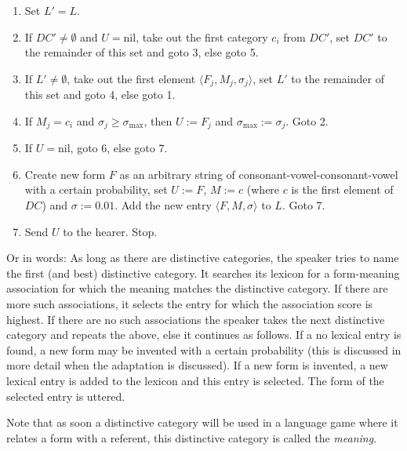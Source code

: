 \begin{enumerate}

\item Set $L'=L$.

\item If $DC' \neq \emptyset$ and $U=\mbox{nil}$, take out the first category $c_i$ from $DC'$, set $DC'$ to the remainder of this set and goto 3, else goto 5.

\item If $L' \neq \emptyset$, take out the first element $\langle F_j,M_j,\sigma_j \rangle$, set $L'$ to the remainder of this set and goto 4, else goto 1.

\item If $M_j = c_i$ and $\sigma_j \geq \sigma_{\mbox{max}}$, then $U:=F_j$ and $\sigma_{\mbox{max}}:=\sigma_j$. Goto 2.

\item If $U = \mbox{nil}$, goto 6, else goto 7.

\item Create new form $F$ as an arbitrary string of consonant-vowel-consonant-vowel with a certain probability, set $U:=F$, $M:=c$ (where $c$ is the first element of $DC$) and $\sigma:=0.01$. Add the new entry $\langle F,M,\sigma \rangle$ to $L$. Goto 7.

\item Send $U$ to the hearer. Stop.

\end{enumerate}


\noindent
Or in words: As long as there are distinctive categories, the speaker tries to name the first (and best) distinctive category. It searches its lexicon for a form-meaning association for which the meaning matches the distinctive category. If there are more such associations, it selects the entry for which the association score is highest. If there are no such associations the speaker takes the next distinctive category and repeats the above, else it continues as follows. If a no lexical entry is found, a new form may be invented with a certain probability (this is discussed in more detail when the adaptation is discussed). If a new form is invented, a new lexical entry is added to the lexicon and this entry is selected. The form of the selected entry is uttered.

Note that as soon a distinctive category will be used in a language game where it relates a form with a referent, this distinctive category is called the {\em meaning}. 


